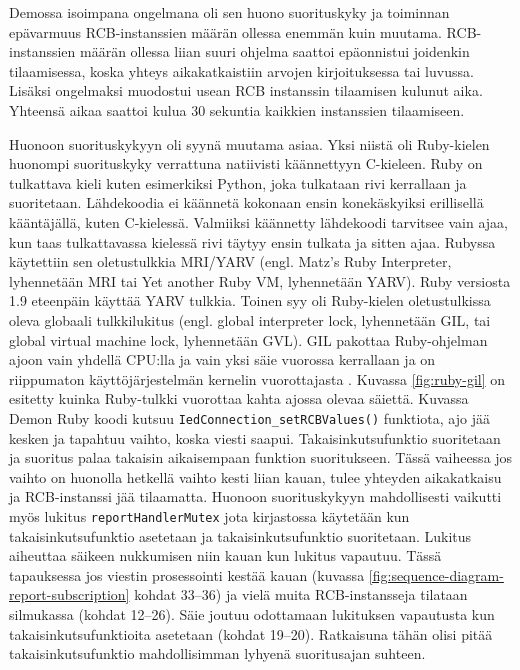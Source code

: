 Demossa isoimpana ongelmana oli sen huono suorituskyky ja toiminnan epävarmuus RCB-instanssien määrän ollessa enemmän kuin muutama. RCB-instanssien määrän ollessa liian suuri ohjelma saattoi epäonnistui joidenkin tilaamisessa, koska yhteys aikakatkaistiin arvojen kirjoituksessa tai luvussa. Lisäksi ongelmaksi muodostui usean RCB instanssin tilaamisen kulunut aika. Yhteensä aikaa saattoi kulua 30 sekuntia kaikkien instanssien tilaamiseen.

Huonoon suorituskykyyn oli syynä muutama asiaa. Yksi niistä oli Ruby-kielen huonompi suorituskyky verrattuna natiivisti käännettyyn C-kieleen. Ruby on tulkattava kieli kuten esimerkiksi Python, joka tulkataan rivi kerrallaan ja suoritetaan. Lähdekoodia ei käännetä kokonaan ensin konekäskyiksi erillisellä kääntäjällä, kuten C-kielessä. Valmiiksi käännetty lähdekoodi tarvitsee vain ajaa, kun taas tulkattavassa kielessä rivi täytyy ensin tulkata ja sitten ajaa. Rubyssa käytettiin sen oletustulkkia MRI/YARV (engl. Matz's Ruby Interpreter, lyhennetään MRI tai Yet another Ruby VM, lyhennetään YARV). Ruby versiosta 1.9 eteenpäin käyttää YARV tulkkia. Toinen syy oli Ruby-kielen oletustulkissa oleva globaali tulkkilukitus (engl. global interpreter lock, lyhennetään GIL, tai global virtual machine lock, lyhennetään GVL). GIL pakottaa Ruby-ohjelman ajoon vain yhdellä CPU:lla ja vain yksi säie vuorossa kerrallaan ja on riippumaton käyttöjärjestelmän kernelin vuorottajasta \mbox{\cite[s.~131--133]{Odaira2014}}. Kuvassa \ref{fig:ruby-gil} on esitetty kuinka Ruby-tulkki vuorottaa kahta ajossa olevaa säiettä. Kuvassa Demon Ruby koodi kutsuu \texttt{IedConnection\_setRCBValues()} funktiota, ajo jää kesken ja tapahtuu vaihto, koska viesti saapui. Takaisinkutsufunktio suoritetaan ja suoritus palaa takaisin aikaisempaan funktion suoritukseen. Tässä vaiheessa jos vaihto on huonolla hetkellä vaihto kesti liian kauan, tulee yhteyden aikakatkaisu ja RCB-instanssi jää tilaamatta. Huonoon suorituskykyyn mahdollisesti vaikutti myös lukitus \texttt{reportHandlerMutex} jota kirjastossa käytetään kun takaisinkutsufunktio asetetaan ja takaisinkutsufunktio suoritetaan. Lukitus aiheuttaa säikeen nukkumisen niin kauan kun lukitus vapautuu. Tässä tapauksessa jos viestin prosessointi kestää kauan (kuvassa \ref{fig:sequence-diagram-report-subscription} kohdat 33--36) ja vielä muita RCB-instansseja tilataan silmukassa (kohdat 12--26). Säie joutuu odottamaan lukituksen vapautusta kun takaisinkutsufunktioita asetetaan (kohdat 19--20). Ratkaisuna tähän olisi pitää takaisinkutsufunktio mahdollisimman lyhyenä suoritusajan suhteen.

